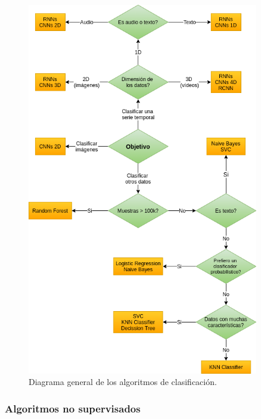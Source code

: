 \documentclass[a4paper,12pt]{article}
\begin{document}
\begin{figure}[H]
	\begin{center}				
	\includegraphics[width=0.9\textwidth]{classificationdiagram.png}
  	\caption{Diagrama general de los algoritmos de clasificación.}
  	\label{fig:classificationdiagram.}
  	\end{center}
\end{figure}

\subsubsection{Algoritmos no supervisados}
\end{document}
